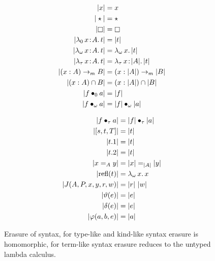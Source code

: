 

\begin{figure}
    \centering
    \begin{minipage}{0.5\textwidth}
        \begin{align*}
            |x| &= x \\
            |\star| &= \star \\
            |\kind| &= \kind \\
            |\abs{\lambda_0}{x}{A}{t}| &= |t| \\
            |\abs{\lambda_\omega}{x}{A}{t}| &= \absu{\lambda_\omega}{x}{|t|} \\
            |\abs{\lambda_\tau}{x}{A}{t}| &= \abs{\lambda_\tau}{x}{|A|}{|t|} \\
            |(x:A) \to_m B| &= (x:|A|) \to_m |B| \\
            |(x:A) \cap B| &= (x:|A|) \cap |B| \\
            |\app{f}{0}{a}| &= |f| \\
            |\app{f}{\omega}{a}| &= \app{|f|}{\omega}{|a|}
        \end{align*}
    \end{minipage}%
    \begin{minipage}{0.5\textwidth}
        \begin{align*}
            |f \bullet_{\tau} a| &= |f| \bullet_{\tau} |a| \\
            |[s, t, T]| &= |t| \\
            |t.1| &= |t| \\
            |t.2| &= |t| \\
            |x =_A y| &= |x| =_{|A|} |y| \\
            |\text{refl}(t)| &= {\lambda_\omega}\, x.\, x \\
            |J(A,P,x,y,r,w)| &= |r|\ |w| \\
            |\vartheta(e)| &= |e| \\
            |\delta(e)| &= |e| \\
            |\varphi(a,b,e)| &= |a|
        \end{align*}
    \end{minipage}
    \caption{Erasure of syntax, for type-like and kind-like syntax erasure is homomorphic, for term-like syntax erasure reduces to the untyped lambda calculus.}
\end{figure}
